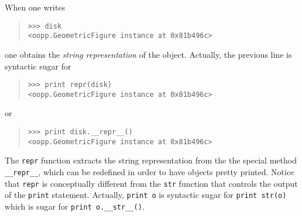 \documentclass[10pt,english]{article}
\begin{document}
When one  writes
\begin{quote}
\begin{verbatim}>>> disk
<oopp.GeometricFigure instance at 0x81b496c>\end{verbatim}
\end{quote}

one obtains the \emph{string representation} of the object. Actually, the previous
line is syntactic sugar for
\begin{quote}
\begin{verbatim}>>> print repr(disk)
<oopp.GeometricFigure instance at 0x81b496c>\end{verbatim}
\end{quote}

or
\begin{quote}
\begin{verbatim}>>> print disk.__repr__()
<oopp.GeometricFigure instance at 0x81b496c>\end{verbatim}
\end{quote}

The \texttt{repr} function extracts the string representation from the
the special method \texttt{{\_}{\_}repr{\_}{\_}}, which can be redefined in order to 
have objects pretty printed. Notice that \texttt{repr} is conceptually
different from the \texttt{str} function that controls the output of the \texttt{print} 
statement. Actually, \texttt{print o} is syntactic sugar for \texttt{print str(o)}
which is sugar for \texttt{print o.{\_}{\_}str{\_}{\_}()}.
\end{document}

